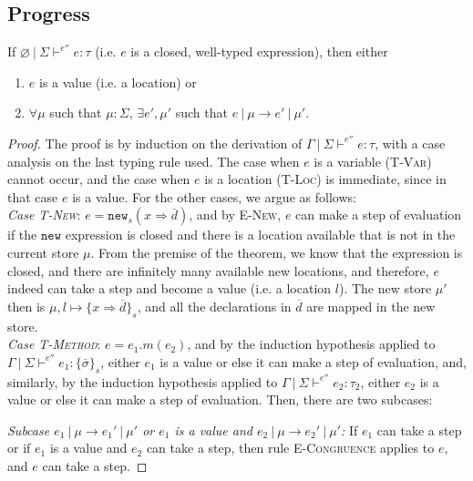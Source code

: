 \documentclass{llncs}
\newcommand{\keywadj}[1]{\mathtt{#1}}
\begin{document}
\subsection{Progress}

\begin{theorem}[Progress]
If $\varnothing~|~\Sigma \vdash^{e''} e : \tau$ (i.e. $e$ is a closed, well-typed expression), then either
\begin{enumerate}
\item $e$ is a value (i.e. a location) or
\item $\forall \mu$ such that $\mu : \Sigma$,
   $\exists e', \mu'$ such that $e~|~\mu \longrightarrow e'~|~\mu'$.
\end{enumerate}
\end{theorem}
\begin{proof} The proof is by induction on the derivation of $\Gamma~|~\Sigma \vdash^{e''} e : \tau$, with a case analysis on the last typing rule used. The case when $e$ is a variable (\textsc{T-Var}) cannot occur, and the case when $e$ is a location (\textsc{T-Loc}) is immediate, since in that case $e$ is a value. For the other cases, we argue as follows:
\\

\noindent\textit{Case \textsc{T-New}}:
$e = \keywadj{new}_{s}(x \Rightarrow \overline{d})$, and by \textsc{E-New}, $e$ can make a step of evaluation if the $\keywadj{new}$ expression is closed and there is a location available that is not in the current store $\mu$. From the premise of the theorem, we know that the expression is closed, and there are infinitely many available new locations, and therefore, $e$ indeed can take a step and become a value (i.e. a location $l$). The new store $\mu'$ then is $\mu, l \mapsto \{ x \Rightarrow \overline{d} \}_{s}$, and all the declarations in $\overline{d}$ are mapped in the new store.
\\

\noindent\textit{Case \textsc{T-Method}}:
$e = e_1.m(e_2)$, and by the induction hypothesis applied to $\Gamma~|~\Sigma \vdash^{e''} e_1 : \{ \overline{\sigma} \}_s$, either $e_1$ is a value or else it can make a step of evaluation, and, similarly, by the induction hypothesis applied to $\Gamma~|~\Sigma \vdash^{e''} e_2 : \tau_2$, either $e_2$ is a value or else it can make a step of evaluation. Then, there are two subcases:

\textit{Subcase $e_1~|~\mu \longrightarrow e_1'~|~\mu'$ or $e_1$ is a value and $e_2~|~\mu \longrightarrow e_2'~|~\mu'$:} If $e_1$ can take a step or if $e_1$ is a value and $e_2$ can take a step, then rule \textsc{E-Congruence} applies to $e$, and $e$ can take a step.


\end{proof}
\end{document}
